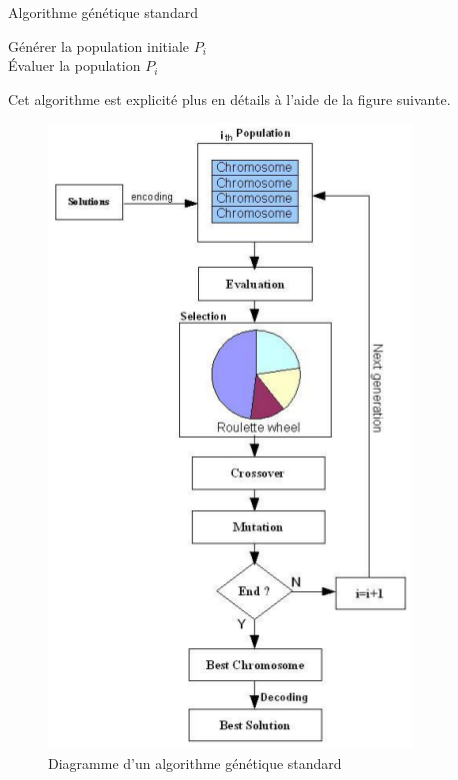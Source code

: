 \documentclass[12pt,a4paper]{article}
\begin{document}
	\begin{algorithm}[H]
 	\caption{Algorithme génétique standard}
 	Générer la population initiale $P_{i}$ \\
 	Évaluer la population $P_{i}$ \\
	\end{algorithm}
	
	\vspace*{1cm}
	Cet algorithme est explicité plus en détails à l'aide de la figure suivante.
	
	\begin{figure}[!h]
		\begin{center}
			\includegraphics[scale=.5]{img/genetic_algo_flowchart.png}
			\caption{Diagramme d'un algorithme génétique standard}
		\end{center}
	\end{figure}
	
\end{document}
